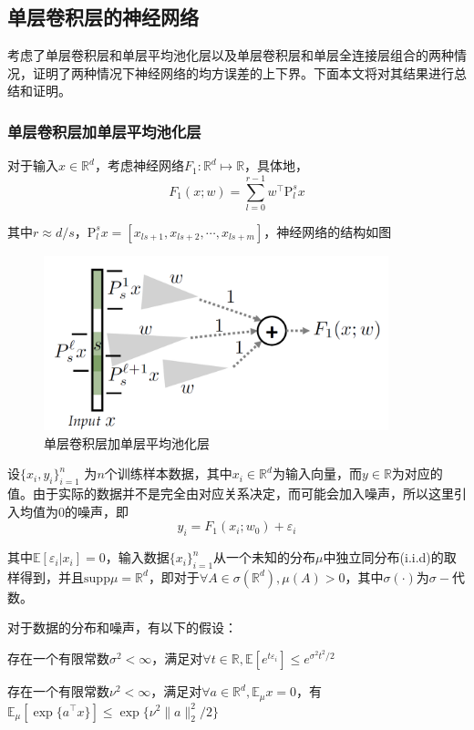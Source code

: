 \subsection{单层卷积层的神经网络}
\citet{du2018many}考虑了单层卷积层和单层平均池化层以及单层卷积层和单层全连接层组合的两种情况，\citet{du2018many}证明了两种情况下神经网络的均方误差的上下界。下面本文将对其结果进行总结和证明。
\subsubsection{单层卷积层加单层平均池化层}
对于输入$x\in \mathbb{R}^d$，考虑神经网络$F_1: \mathbb{R}^d \mapsto \mathbb{R}$，具体地，
\[
  F_1(x;w) = \sum_{l=0}^{r-1}w^{\top} \mathrm{P}_l^s x
\]
\par
其中$r\approx d/s$，$\mathrm{P}_l^s x=[x_{ls+1},x_{ls+2},\cdots,x_{ls+m}]$，神经网络的结构如图
\begin{figure}
\centering
\includegraphics[width=10cm]{./figures/convp.PNG}
\caption{单层卷积层加单层平均池化层}
\label{fig:convp}
\end{figure}
\par
设$\{x_i,y_i\}_{i=1}^n$ 为$n$个训练样本数据，其中$x_i \in \mathbb{R}^d$为输入向量，而$y\in \mathbb{R}$为对应的值。由于实际的数据并不是完全由对应关系决定，而可能会加入噪声，所以这里引入均值为0的噪声，即
\[
  y_i = F_1(x_i;w_0)+\varepsilon_i
\]
\par
其中$\mathbb{E}[\varepsilon_i|x_i] = 0$，输入数据$\{x_i\}_{i=1}^n$从一个未知的分布$\mu$中独立同分布(i.i.d)的取样得到，并且$\mathrm{supp}\mu = \mathbb{R}^d$，即对于$\forall A \in \sigma(\mathbb{R}^d), \mu(A) > 0$，其中$\sigma(\cdot)$为$\sigma-$代数。
\par
对于数据的分布和噪声，有以下的假设：
\begin{assumption}
存在一个有限常数$\sigma^2< \infty$，满足对$\forall t \in \mathbb{R}, \mathbb{E}[e^{t\varepsilon_i}] \leq e^{\sigma^2t^2/2}$
\end{assumption}
\begin{assumption}
存在一个有限常数$\nu^2< \infty$，满足对$\forall a \in \mathbb{R}^d, \mathbb{E}_\mu x = 0$，有$\mathbb{E}_\mu[\exp\{a^\top x\}]\leq \exp\{\nu^2\|a\|_2^2/2\}$
\end{assumption}
